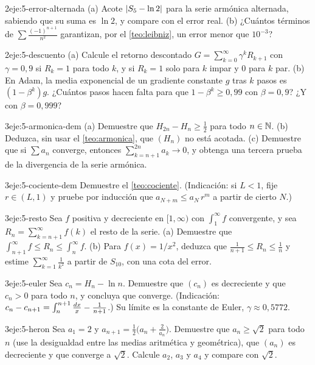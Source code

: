 \begin{ejercicio}{2}{eje:5-error-alternada}
(a) Acote $\lvert S_5-\ln2\rvert$ para la serie armónica alternada, sabiendo que su suma es $\ln2$, y compare con el error real. (b) ¿Cuántos términos de $\sum\frac{(-1)^{n+1}}{n^{2}}$ garantizan, por el \cref{teo:leibniz}, un error menor que $10^{-3}$?
\end{ejercicio}

\begin{ejercicio}{2}{eje:5-descuento}
(a) Calcule el retorno descontado $G=\sum_{k=0}^{\infty}\gamma^{k}R_{k+1}$ con $\gamma=0{,}9$ si $R_k=1$ para todo $k$, y si $R_k=1$ solo para $k$ impar y $0$ para $k$ par. (b) En Adam, la media exponencial de un gradiente constante $g$ tras $k$ pasos es $(1-\beta^{k})g$. ¿Cuántos pasos hacen falta para que $1-\beta^{k}\ge0{,}99$ con $\beta=0{,}9$? ¿Y con $\beta=0{,}999$?
\end{ejercicio}

\begin{ejercicio}{3}{eje:5-armonica-dem}
(a) Demuestre que $H_{2n}-H_n\ge\frac12$ para todo $n\in\mathbb{N}$. (b) Deduzca, sin usar el \cref{teo:armonica}, que $(H_n)$ no está acotada. (c) Demuestre que si $\sum a_n$ converge, entonces $\sum_{k=n+1}^{2n}a_k\to0$, y obtenga una tercera prueba de la divergencia de la serie armónica.
\end{ejercicio}

\begin{ejercicio}{3}{eje:5-cociente-dem}
Demuestre el \cref{teo:cociente}. (Indicación: si $L<1$, fije $r\in(L,1)$ y pruebe por inducción que $a_{N+m}\le a_N\,r^{m}$ a partir de cierto $N$.)
\end{ejercicio}

\begin{ejercicio}{3}{eje:5-resto}
Sea $f$ positiva y decreciente en $[1,\infty)$ con $\int_1^{\infty}f$ convergente, y sea $R_n=\sum_{k=n+1}^{\infty}f(k)$ el resto de la serie. (a) Demuestre que $\int_{n+1}^{\infty}f\le R_n\le\int_n^{\infty}f$. (b) Para $f(x)=1/x^{2}$, deduzca que $\frac{1}{n+1}\le R_n\le\frac1n$ y estime $\sum_{k=1}^{\infty}\frac{1}{k^{2}}$ a partir de $S_{10}$, con una cota del error.
\end{ejercicio}

\begin{ejercicio}{3}{eje:5-euler}
Sea $c_n=H_n-\ln n$. Demuestre que $(c_n)$ es decreciente y que $c_n>0$ para todo $n$, y concluya que converge. (Indicación: $c_n-c_{n+1}=\int_n^{n+1}\frac{\mathop{}\!d x}{x}-\frac{1}{n+1}$.) Su límite es la constante de Euler, $\gamma\approx0{,}5772$.
\end{ejercicio}

\begin{ejercicio}{3}{eje:5-heron}
Sea $a_1=2$ y $a_{n+1}=\frac12\bigl(a_n+\frac{2}{a_n}\bigr)$. Demuestre que $a_n\ge\sqrt2$ para todo $n$ (use la desigualdad entre las medias aritmética y geométrica), que $(a_n)$ es decreciente y que converge a $\sqrt2$. Calcule $a_2$, $a_3$ y $a_4$ y compare con $\sqrt2$.
\end{ejercicio}
